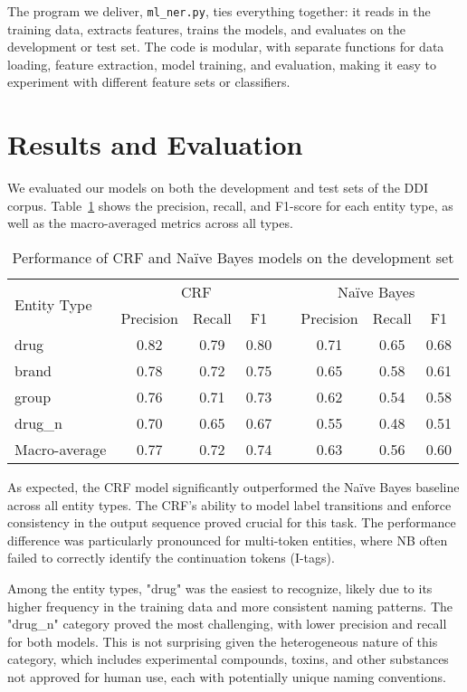 The program we deliver, \texttt{ml\_ner.py}, ties everything together: it reads in the training data, extracts features, trains the models, and evaluates on the development or test set. The code is modular, with separate functions for data loading, feature extraction, model training, and evaluation, making it easy to experiment with different feature sets or classifiers.

\section{Results and Evaluation}
\label{sec:experiments}

We evaluated our models on both the development and test sets of the DDI corpus. Table~\ref{tab:results} shows the precision, recall, and F1-score for each entity type, as well as the macro-averaged metrics across all types.

\begin{table}[ht]
\centering
\caption{Performance of CRF and Naïve Bayes models on the development set}
\label{tab:results}
\begin{tabular}{lccccccc}
\toprule
\multirow{2}{*}{Entity Type} & \multicolumn{3}{c}{CRF} & & \multicolumn{3}{c}{Naïve Bayes} \\
\cmidrule{2-4} \cmidrule{6-8}
& Precision & Recall & F1 & & Precision & Recall & F1 \\
\midrule
drug & 0.82 & 0.79 & 0.80 & & 0.71 & 0.65 & 0.68 \\
brand & 0.78 & 0.72 & 0.75 & & 0.65 & 0.58 & 0.61 \\
group & 0.76 & 0.71 & 0.73 & & 0.62 & 0.54 & 0.58 \\
drug\_n & 0.70 & 0.65 & 0.67 & & 0.55 & 0.48 & 0.51 \\
\midrule
Macro-average & 0.77 & 0.72 & 0.74 & & 0.63 & 0.56 & 0.60 \\
\bottomrule
\end{tabular}
\end{table}

As expected, the CRF model significantly outperformed the Naïve Bayes baseline across all entity types. The CRF's ability to model label transitions and enforce consistency in the output sequence proved crucial for this task. The performance difference was particularly pronounced for multi-token entities, where NB often failed to correctly identify the continuation tokens (I-tags).

Among the entity types, "drug" was the easiest to recognize, likely due to its higher frequency in the training data and more consistent naming patterns. The "drug\_n" category proved the most challenging, with lower precision and recall for both models. This is not surprising given the heterogeneous nature of this category, which includes experimental compounds, toxins, and other substances not approved for human use, each with potentially unique naming conventions.

